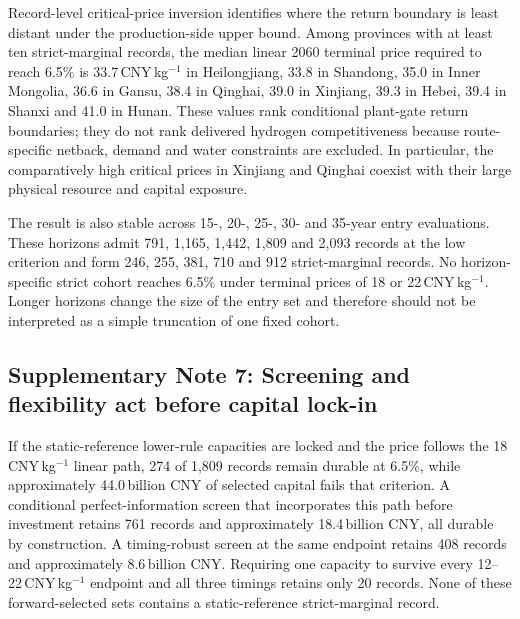 \documentclass[pdflatex,sn-nature]{sn-jnl}
\begin{document}
Record-level critical-price inversion identifies where the return boundary is least distant under the production-side upper bound. Among provinces with at least ten strict-marginal records, the median linear 2060 terminal price required to reach 6.5\% is 33.7\,CNY\,kg$^{-1}$ in Heilongjiang, 33.8 in Shandong, 35.0 in Inner Mongolia, 36.6 in Gansu, 38.4 in Qinghai, 39.0 in Xinjiang, 39.3 in Hebei, 39.4 in Shanxi and 41.0 in Hunan. These values rank conditional plant-gate return boundaries; they do not rank delivered hydrogen competitiveness because route-specific netback, demand and water constraints are excluded. In particular, the comparatively high critical prices in Xinjiang and Qinghai coexist with their large physical resource and capital exposure.

The result is also stable across 15-, 20-, 25-, 30- and 35-year entry evaluations. These horizons admit 791, 1,165, 1,442, 1,809 and 2,093 records at the low criterion and form 246, 255, 381, 710 and 912 strict-marginal records. No horizon-specific strict cohort reaches 6.5\% under terminal prices of 18 or 22\,CNY\,kg$^{-1}$. Longer horizons change the size of the entry set and therefore should not be interpreted as a simple truncation of one fixed cohort.

\subsection*{Supplementary Note 7: Screening and flexibility act before capital lock-in}

If the static-reference lower-rule capacities are locked and the price follows the 18\,CNY\,kg$^{-1}$ linear path, 274 of 1,809 records remain durable at 6.5\%, while approximately 44.0\,billion CNY of selected capital fails that criterion. A conditional perfect-information screen that incorporates this path before investment retains 761 records and approximately 18.4\,billion CNY, all durable by construction. A timing-robust screen at the same endpoint retains 408 records and approximately 8.6\,billion CNY. Requiring one capacity to survive every 12--22\,CNY\,kg$^{-1}$ endpoint and all three timings retains only 20 records. None of these forward-selected sets contains a static-reference strict-marginal record.
\end{document}
